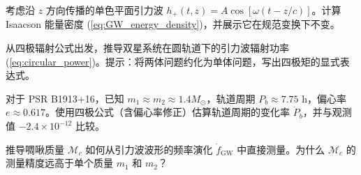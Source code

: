 \begin{exercise}
考虑沿 $z$ 方向传播的单色平面引力波 $h_+(t,z) = A\cos[\omega(t-z/c)]$。计算 Isaacson 能量密度 (\ref{eq:GW_energy_density})，并展示它在规范变换下不变。
\end{exercise}

\begin{exercise}
从四极辐射公式出发，推导双星系统在圆轨道下的引力波辐射功率 (\ref{eq:circular_power})。提示：将两体问题约化为单体问题，写出四极矩的显式表达式。
\end{exercise}

\begin{exercise}
对于 PSR B1913+16，已知 $m_1 \approx m_2 \approx 1.4 M_\odot$，轨道周期 $P_b \approx 7.75$ h，偏心率 $e \approx 0.617$。使用四极公式（含偏心率修正）估算轨道周期的变化率 $\dot{P}_b$，并与观测值 $-2.4\times10^{-12}$ 比较。
\end{exercise}

\begin{exercise}
推导啁啾质量 $\mathcal{M}_c$ 如何从引力波波形的频率演化 $\dot{f}_{\text{GW}}$ 中直接测量。为什么 $\mathcal{M}_c$ 的测量精度远高于单个质量 $m_1$ 和 $m_2$？
\end{exercise}
